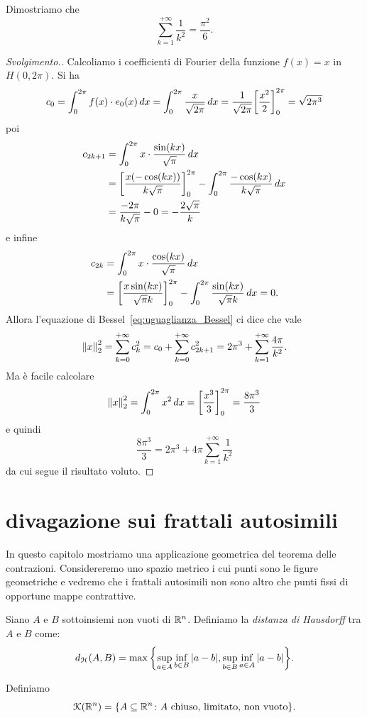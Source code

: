 \begin{exercise}
Dimostriamo che
\[
  \sum_{k=1}^{+\infty} \frac{1}{k^2} = \frac{\pi^2}{6}.
\]
\end{exercise}
\begin{proof}[Svolgimento.]
Calcoliamo i coefficienti di Fourier della funzione $f(x)=x$ in $H(0,2\pi)$.
Si ha
\[
 c_0 = \int_0^{2\pi} f(x)\cdot e_0(x)\, dx = \int_0^{2\pi} \frac{x}{\sqrt{2\pi}}\, dx = \frac{1}{\sqrt{2\pi}}{\left[ \frac{x^2}{2} \right]}_0^{2\pi}
  = \sqrt{2\pi^3}
\]
poi
\begin{align*}
  c_{2k+1} &= \int_0^{2\pi} x \cdot \frac{\sin(kx)}{\sqrt \pi}\, dx \\
   &= {\left[ \frac{x(-\cos(kx))}{k\sqrt \pi} \right]}_0^{2\pi}
   - \int_0^{2\pi} \frac{-\cos(kx)}{k\sqrt \pi}\, dx\\
   &= \frac{-2\pi}{k\sqrt \pi} - 0 = -\frac{2\sqrt \pi}{k}
\end{align*}
e infine
\begin{align*}
  c_{2k} &= \int_0^{2\pi} x \cdot \frac{\cos (kx)}{\sqrt \pi}\, dx \\
  &= {\left[ \frac{x \sin(kx)}{\sqrt \pi k} \right]}_0^{2\pi}
  - \int_0^{2\pi} \frac{\sin(kx)}{\sqrt \pi k}\, dx
  = 0.
\end{align*}
Allora l'equazione di Bessel~\eqref{eq:uguaglianza_Bessel} ci dice
che vale
\[
  {\left\Vert x\right\Vert}_2^2 = \sum_{k=0}^{+\infty} c_k^2
  = c_0 + \sum_{k=0}^{+\infty} c_{2k+1}^2
  = 2\pi^3 + \sum_{k=1}^{+\infty} \frac{4\pi}{k^2}.
\]
Ma è facile calcolare
\[
 {\left\Vert x\right\Vert}_2^2 = \int_0^{2\pi} x^2\, dx = {\left[ \frac{x^3}{3} \right]}_0^{2\pi}
  = \frac{8\pi^3}{3}
\]
e quindi
\[
  \frac{8\pi^3}{3} = 2\pi^3 + 4\pi \sum_{k=1}^{+\infty}\frac{1}{k^2}
\]
da cui segue il risultato voluto.
\end{proof}

\section{divagazione sui frattali autosimili}

In questo capitolo mostriamo una applicazione geometrica del teorema delle contrazioni.
Considereremo uno spazio metrico i cui punti sono le figure geometriche
e vedremo che i frattali autosimili non sono altro che punti fissi
di opportune mappe contrattive.

\begin{definition}
Siano $A$ e $B$ sottoinsiemi non vuoti di $\mathbb R^n$.
Definiamo la \emph{distanza di Hausdorff}
tra $A$ e $B$ come:
\[
  d_{\mathcal H}(A,B) = \max{\left\{ \sup_{a\in A}\inf_{b\in B} {\left|a-b\right|}, \sup_{b\in B} \inf_{a\in A} {\left|a-b\right|} \right\}}.
\]

Definiamo
\[
 \mathcal K(\mathbb R^n) = {\left\{ A \subseteq \mathbb R^n \colon \text{$A$ chiuso, limitato, non vuoto} \right\}}.
\]
\end{definition}

